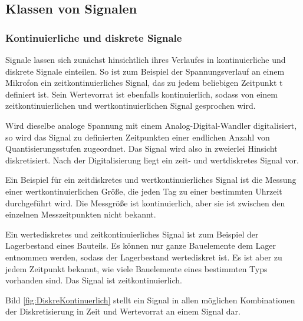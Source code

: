\subsection{ Klassen von Signalen}


\subsubsection{ Kontinuierliche und diskrete Signale}
Signale lassen sich zun\"{a}chst hinsichtlich ihres Verlaufes in kontinuierliche und diskrete Signale einteilen. So ist zum Beispiel der Spannungsverlauf an einem Mikrofon ein zeitkontinuierliches Signal, das zu jedem beliebigen Zeitpunkt t definiert ist. Sein Wertevorrat ist ebenfalls kontinuierlich, sodass von einem zeitkontinuierlichen und wertkontinuierlichen Signal gesprochen wird.

\noindent Wird dieselbe analoge Spannung mit einem Analog-Digital-Wandler digitalisiert, so wird das Signal zu definierten Zeitpunkten einer endlichen Anzahl von Quantisierungsstufen zugeordnet. Das Signal wird also in zweierlei Hinsicht diskretisiert. Nach der Digitalisierung liegt ein zeit- und wertdiskretes Signal vor.

\noindent Ein Beispiel f\"{u}r ein zeitdiskretes und wertkontinuierliches Signal ist die Messung einer wertkontinuierlichen Gr\"{o}{\ss}e, die jeden Tag zu einer bestimmten Uhrzeit durchgef\"{u}hrt wird. Die Messgr\"{o}{\ss}e ist kontinuierlich, aber sie ist zwischen den einzelnen Messzeitpunkten nicht bekannt.

\noindent Ein wertediskretes und zeitkontinuierliches Signal ist zum Beispiel der Lagerbestand eines Bauteils. Es k\"{o}nnen nur ganze Bauelemente dem Lager entnommen werden, sodass der Lagerbestand wertediskret ist. Es ist aber zu jedem Zeitpunkt bekannt, wie viele Bauelemente eines bestimmten Typs vorhanden sind. Das Signal ist zeitkontinuierlich.\newline

\noindent Bild \ref{fig:DiskreKontinuerlich} stellt ein Signal in allen m\"{o}glichen Kombinationen der Diskretisierung in Zeit und Wertevorrat an einem Signal dar. 

